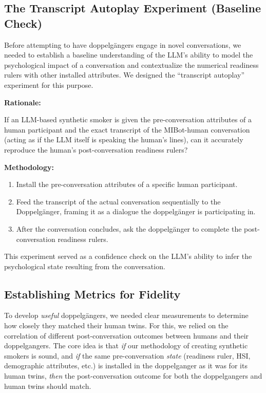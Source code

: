 \subsection{The Transcript Autoplay Experiment (Baseline Check)}
\label{sec:transcript-autoplay}
Before attempting to have doppelgängers engage in novel conversations, we needed to establish a baseline understanding of the LLM's ability to model the psychological impact of a conversation and contextualize the numerical readiness rulers with other installed attributes. We designed the ``transcript autoplay'' experiment for this purpose.

\textbf{Rationale:} 

If an LLM-based synthetic smoker is given the pre-conversation attributes of a human participant and the exact transcript of the MIBot-human conversation (acting as if the LLM itself is speaking the human's lines), can it accurately reproduce the human's post-conversation readiness rulers?

\textbf{Methodology:}
\begin{enumerate}
    \item Install the pre-conversation attributes of a specific human participant.
    \item Feed the transcript of the actual conversation sequentially to the Doppelgänger, framing it as a dialogue the doppelgänger is participating in.
    \item After the conversation concludes, ask the doppelgänger to complete the post-conversation readiness rulers.
\end{enumerate}

This experiment served as a confidence check on the LLM's ability to infer the psychological state resulting from the conversation.



\subsection{Establishing Metrics for Fidelity}
\label{sec:synthetic-smoker-validation}
To develop \emph{useful} doppelgängers, we needed clear measurements to determine how closely they matched their human twins. For this, we relied on the correlation of different post-conversation outcomes between humans and their doppelgangers. The core idea is that \emph{if} our methodology of creating synthetic smokers is sound, and \emph{if} the same pre-conversation \emph{state} (readiness ruler, HSI, demographic attributes, etc.) is installed in the doppelganger as it was for its human twins, \emph{then} the post-conversation outcome for both the doppelgangers and human twins should match. 

